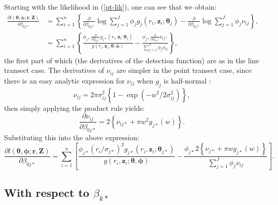 Starting with the likelihood in (\ref{pt-lik}), one can see that we obtain:
\begin{align*}
\frac{\partial l(\bm{\theta}, \bm{\phi}; \mathbf{r},\mathbf{Z})}{\partial \beta_{0j*}}  &= \sum_{i=1}^n \left \{ \frac{\partial}{\partial \beta_{0j*}} \log \sum_{j=1}^J \phi_j g_j(r_i,\mathbf{z}_i; \bm{\theta}_j) - \frac{\partial}{\partial \beta_{0j*}}\log \sum_{j=1}^J \phi_j \nu_{ij}\right \},\\
&= \sum_{i=1}^n \left \{ \frac{ \phi_{j*} \frac{\partial}{\partial \beta_{0j*}}  g_{j*} (r_i,\mathbf{z}_i; \bm{\theta}_j)}{g(r_i,\mathbf{z}_i; \bm{\theta}, \bm{\phi})} - \frac{ \phi_{j*}\frac{\partial}{\partial \beta_{0j*}}  \nu_{ij*} }{ \sum_{j=1}^J \phi_j \nu_{ij}}\right \},
\end{align*}
the first part of which (the derivatives of the detection function) are as in the line transect case. The derivatives of $\nu_{ij}$ are simpler in the point transect case, since there is an easy analytic expression for $\nu_{ij}$ when $g_j$ is half-normal :
\begin{equation*}
\nu_{ij} = 2 \pi \sigma_{ij}^2 \left \{ 1-\exp (-w^2/2\sigma_{ij}^2 ) \right \},
\end{equation*}
then simply applying the product rule yields:
\begin{equation*}
\frac{\partial \nu_{ij}}{\partial \beta_{0j*}} = 2 \left \{ \nu_{ij*} + \pi w^2 g_{j*}(w) \right \}.
\end{equation*}
Substituting this into the above expression:
\begin{equation*}
\frac{\partial l(\bm{\theta}, \bm{\phi}; \mathbf{r},\mathbf{Z})}{\partial \beta_{0j*}}  = \sum_{i=1}^n \left [ \frac{ \phi_{j*} (r_i/\sigma_{j*})^2 g_{j*}(r_i,\mathbf{z}_i; \bm{\theta}_{j*})}{g(r_i,\mathbf{z}_i; \bm{\theta}, \bm{\phi})} - \frac{ \phi_{j*} 2 \left \{ \nu_{j*} + \pi w g_{j*}(w) \right \} }{ \sum_{j=1}^J \phi_j \nu_{ij}}\right ].
\end{equation*}

\subsection{With respect to $\beta_{k*}$}

